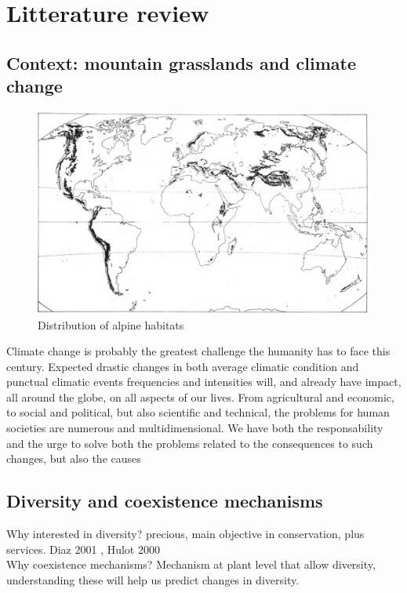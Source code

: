 

\chapter{Litterature review}


\section{Context: mountain grasslands and climate change}

\begin{figure}
\includegraphics{./1_Introduction/graphics/alpine_distribution.jpeg}
\caption{Distribution of alpine habitats}
\end{figure}

Climate change is probably the greatest challenge the humanity has to face this century. Expected drastic changes in both average climatic condition and punctual climatic events frequencies and intensities will, and already have impact, all around the globe, on all aspects of our lives. From agricultural and economic, to social and political, but also scientific and technical, the problems for human societies are numerous and multidimensional. We have both the responsability and the urge to solve both the problems related to the consequences to such changes, but also the causes


\section{Diversity and coexistence mechanisms}
Why interested in diversity? precious, main objective in conservation, plus services. Diaz 2001 , Hulot 2000\\
 Why coexistence mechanisms? Mechanism at plant level that allow diversity, understanding these will help us predict changes in diversity.

